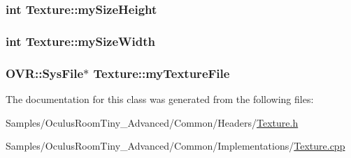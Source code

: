 \subsubsection[{\texorpdfstring{my\+Size\+Height}{mySizeHeight}}]{\setlength{\rightskip}{0pt plus 5cm}int Texture\+::my\+Size\+Height\hspace{0.3cm}{\ttfamily [protected]}}\hypertarget{class_texture_a83942c4f554c8af7884c31baf3a81b6e}{}\label{class_texture_a83942c4f554c8af7884c31baf3a81b6e}
\subsubsection[{\texorpdfstring{my\+Size\+Width}{mySizeWidth}}]{\setlength{\rightskip}{0pt plus 5cm}int Texture\+::my\+Size\+Width\hspace{0.3cm}{\ttfamily [protected]}}\hypertarget{class_texture_abfb0ad95408fbefd68bafbaada18483c}{}\label{class_texture_abfb0ad95408fbefd68bafbaada18483c}
\subsubsection[{\texorpdfstring{my\+Texture\+File}{myTextureFile}}]{\setlength{\rightskip}{0pt plus 5cm}O\+V\+R\+::\+Sys\+File$\ast$ Texture\+::my\+Texture\+File\hspace{0.3cm}{\ttfamily [protected]}}\hypertarget{class_texture_aad71ad1112c80f067b0655c30cfa6e31}{}\label{class_texture_aad71ad1112c80f067b0655c30cfa6e31}


The documentation for this class was generated from the following files\+:\begin{DoxyCompactItemize}
\item 
Samples/\+Oculus\+Room\+Tiny\+\_\+\+Advanced/\+Common/\+Headers/\hyperlink{_texture_8h}{Texture.\+h}\item 
Samples/\+Oculus\+Room\+Tiny\+\_\+\+Advanced/\+Common/\+Implementations/\hyperlink{_texture_8cpp}{Texture.\+cpp}\end{DoxyCompactItemize}
